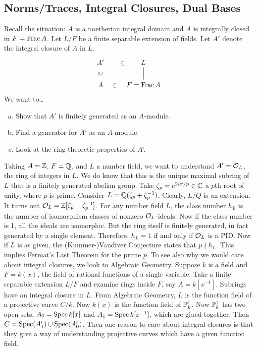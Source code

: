 \newpage
\subsection{Norms/Traces, Integral Closures, Dual Bases\label{sec:620_3}}

Recall the situation: $A$ is a noetherian integral domain and $A$ is integrally closed in $F=\Frac A$. Let $L/F$ be a finite separable extension of fields. Let $A'$ denote the integral closure of $A$ in $L$. 
	\[
	\begin{tikzcd}
	 A' \arrow[draw=none]{d}[sloped,auto=false]{\supseteq} \arrow[draw=none]{r}[sloped,auto=false]{\subseteq} & L \arrow[dash]{d} \\
	A \arrow[draw=none]{r}[sloped,auto=false]{\subseteq} & F=\Frac A
	\end{tikzcd}
	\]
We want to\dots
	\begin{enumerate}[(a)]
	\item Show that $A'$ is finitely generated as an $A$-module.
	\item Find a generator for $A'$ as an $A$-module.
	\item Look at the ring theoretic properties of $A$'. 
	\end{enumerate}
Taking $A=\Z$, $F=\Q$, and $L$ a number field, we want to understand $A'=\co_L$, the ring of integers in $L$. We do know that this is the unique maximal subring of $L$ that is a finitely generated abelian group. Take $\zeta_p=e^{2i\pi/p} \in \C$ a $p$th root of unity, where $p$ is prime. Consider $L=\Q(\zeta_p+\zeta_p^{-1})$. Clearly, $L/Q$ is an extension. It turns out $\co_L=\Z[\zeta_p+\zeta_p^{-1}]$. For any number field $L$, the class number $h_L$ is the number of isomorphism classes of nonzero $\co_L$-ideals. Now if the class number is 1, all the ideals are isomorphic. But the ring itself is finitely generated, in fact generated by a single element. Therefore, $h_L=1$ if and only if $\co_L$ is a PID. Now if $L$ is as given, the (Kummer-)Vandiver Conjecture states that $p \nmid h_L$. This implies Fermat's Last Theorem for the prime $p$. To see also why we would care about integral closures, we look to Algebraic Geometry. Suppose $k$ is a field and $F=k(x)$, the field of rational functions of a single variable. Take a finite separable extension $L/F$ and examine rings inside $F$, say $A=k[x^{-1}]$. Subrings have an integral closure in $L$. From Algebraic Geometry, $L$ is the function field of a projective curve $C/k$. Now $k(x)$ is the function field of $\P_k^1$. Now $\P^1_k$ has two open sets, $A_0=\spec k[x]$ and $A_1=\spec k[x^{-1}]$, which are glued together. Then $C=\spec(A_1') \cup \spec(A_0')$. Then one reason to care about integral closures is that they give a way of understanding projective curves which have a given function field. \\



